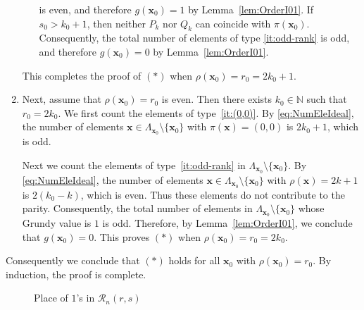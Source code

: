 \documentclass[a4paper,11pt]{amsart}
\theoremstyle{definition}
\newenvironment{demo}[1]{%
  \trivlist
  \item[\hskip\labelsep
        {\bf #1.}]
}{%
\hfill\qedsymbol
  \endtrivlist
}
\numberwithin{equation}{section}
\def\Non{\mathbb{N}}
\def\R#1{\mathcal{R}_{#1}}
\def\x{\boldsymbol{x}}
\def\y{\boldsymbol{y}}
\def\rkf{\rho}
\begin{document}
\begin{demo}{Proof of Theorem~\ref{th:ASM-ideal}}
\begin{enumerate}[label=\arabic*), leftmargin=20pt]
\begin{enumerate}[label=\alph*)]
is even,
and therefore $g(\x_{0})=1$ by Lemma~\ref{lem:OrderI01}.
If $s_{0}> k_{0}+1$,
then neither $P_{k}$ nor $Q_{k}$ can coincide with $\pi(\x_{0})$.
Consequently, the total number of elements of type \ref{it:odd-rank} is odd,
and therefore $g(\x_{0})=0$ by Lemma~\ref{lem:OrderI01}.
%
\end{enumerate}
This completes the proof of $(*)$ when $\rkf(\x_{0})=r_{0}=2k_{0}+1$.
%
\item
Next, assume that $\rkf(\x_{0})=r_{0}$ is even.
Then there exists $k_{0}\in\Non$ such that $r_{0}=2k_{0}$.
We first count the elements of type~\ref{it:(0,0)}.
By \eqref{eq:NumEleIdeal},
the number of elements $\x\in\Lambda_{\x_{0}}\setminus\{\x_{0}\}$ with $\pi(\x)=(0,0)$ is $2k_{0}+1$,
which is odd.
\par\smallskip
Next we count the elements of type~\ref{it:odd-rank} in $\Lambda_{\x_{0}}\setminus\{\x_{0}\}$.
By \eqref{eq:NumEleIdeal},
the number of elements $\x\in\Lambda_{\x_{0}}\setminus\{\x_{0}\}$ with $\rkf(\x)=2k+1$ is $2(k_{0}-k)$,
which is even.
Thus these elements do not contribute to the parity.
Consequently, the total number of elements in $\Lambda_{\x_{0}}\setminus\{\x_{0}\}$
whose Grundy value is $1$ is odd.
Therefore, by Lemma~\ref{lem:OrderI01}, we conclude that $g(\x_{0})=0$.
This proves $(*)$ when $\rkf(\x_{0})=r_{0}=2k_{0}$.
%
\end{enumerate}
Consequently we conclude that $(*)$ holds for all $\x_{0}$ with $\rkf(\x_{0})=r_{0}$.
By induction, the proof is complete.
%
\end{demo}
%
%
%
%
\begin{figure}[htbp]
\centering
{}
\caption{Place of $1$'s in $\R{n}(r,s)$}
\label{fig:pi(ideal)}
\end{figure}
%
%
\end{document}
